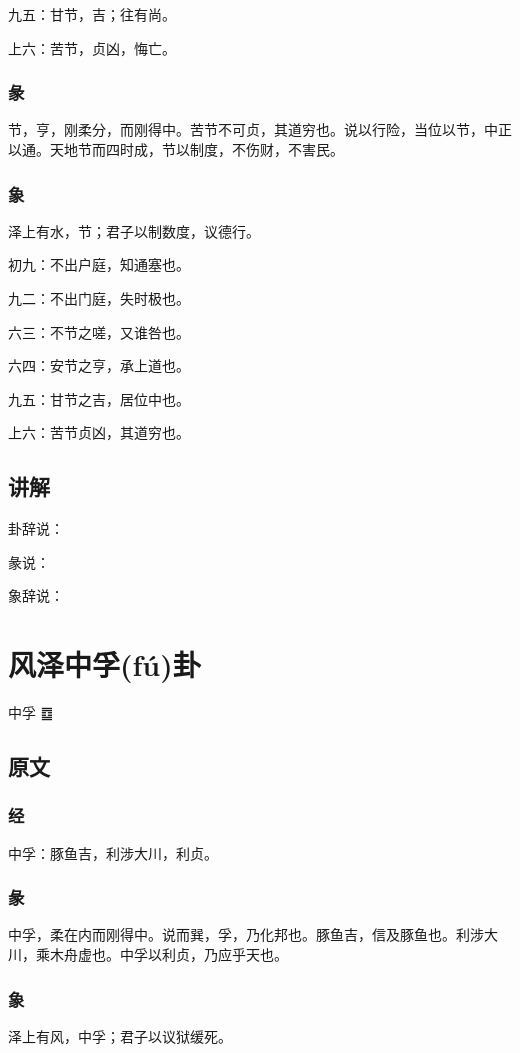 \documentclass[12pt,oneside]{book}
\begin{document}
九五：甘节，吉；往有尚。

上六：苦节，贞凶，悔亡。


\subsection{彖}
节，亨，刚柔分，而刚得中。苦节不可贞，其道穷也。说以行险，当位以节，中正以通。天地节而四时成，节以制度，不伤财，不害民。

\subsection{象}
泽上有水，节；君子以制数度，议德行。

初九：不出户庭，知通塞也。

九二：不出门庭，失时极也。

六三：不节之嗟，又谁咎也。

六四：安节之亨，承上道也。

九五：甘节之吉，居位中也。

上六：苦节贞凶，其道穷也。


\section{讲解}
卦辞说：

彖说：

象辞说：

\chapter{风泽中孚(fú)卦}
中孚 {\LARGE ䷼}


\section{原文}

\subsection{经}
中孚：豚鱼吉，利涉大川，利贞。

\subsection{彖}
中孚，柔在内而刚得中。说而巽，孚，乃化邦也。豚鱼吉，信及豚鱼也。利涉大川，乘木舟虚也。中孚以利贞，乃应乎天也。

\subsection{象}
泽上有风，中孚；君子以议狱缓死。
\end{document}
